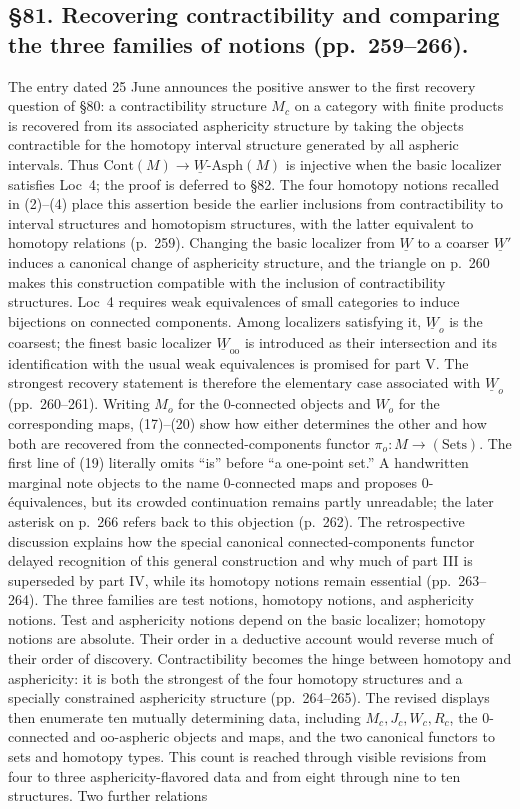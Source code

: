 \documentclass[10pt,oneside]{book}
\begin{document}
\subsection*{\S81. Recovering contractibility and comparing the three families of notions (pp.\ 259--266).}
The entry dated 25 June announces the positive answer to the first recovery question of \S80: a contractibility structure $M_c$ on a category with finite products is recovered from its associated asphericity structure by taking the objects contractible for the homotopy interval structure generated by all aspheric intervals. Thus $\mathrm{Cont}(M)\to\underline{W}\text{-}\mathrm{Asph}(M)$ is injective when the basic localizer satisfies Loc~4; the proof is deferred to \S82. The four homotopy notions recalled in (2)--(4) place this assertion beside the earlier inclusions from contractibility to interval structures and homotopism structures, with the latter equivalent to homotopy relations (p.\ 259). Changing the basic localizer from $\underline{W}$ to a coarser $\underline{W}'$ induces a canonical change of asphericity structure, and the triangle on p.\ 260 makes this construction compatible with the inclusion of contractibility structures. Loc~4 requires weak equivalences of small categories to induce bijections on connected components. Among localizers satisfying it, $\underline{W}_o$ is the coarsest; the finest basic localizer $\underline{W}_{\mathrm{oo}}$ is introduced as their intersection and its identification with the usual weak equivalences is promised for part V. The strongest recovery statement is therefore the elementary case associated with $\underline{W}_o$ (pp.\ 260--261). Writing $M_o$ for the 0-connected objects and $W_o$ for the corresponding maps, (17)--(20) show how either determines the other and how both are recovered from the connected-components functor $\pi_o:M\to(\mathrm{Sets})$. The first line of (19) literally omits “is” before “a one-point set.” A handwritten marginal note objects to the name 0-connected maps and proposes 0-équivalences, but its crowded continuation remains partly unreadable; the later asterisk on p.\ 266 refers back to this objection (p.\ 262). The retrospective discussion explains how the special canonical connected-components functor delayed recognition of this general construction and why much of part III is superseded by part IV, while its homotopy notions remain essential (pp.\ 263--264). The three families are test notions, homotopy notions, and asphericity notions. Test and asphericity notions depend on the basic localizer; homotopy notions are absolute. Their order in a deductive account would reverse much of their order of discovery. Contractibility becomes the hinge between homotopy and asphericity: it is both the strongest of the four homotopy structures and a specially constrained asphericity structure (pp.\ 264--265). The revised displays then enumerate ten mutually determining data, including $M_c,J_c,W_c,R_c$, the 0-connected and $\mathrm{oo}$-aspheric objects and maps, and the two canonical functors to sets and homotopy types. This count is reached through visible revisions from four to three asphericity-flavored data and from eight through nine to ten structures. Two further relations 
\end{document}
